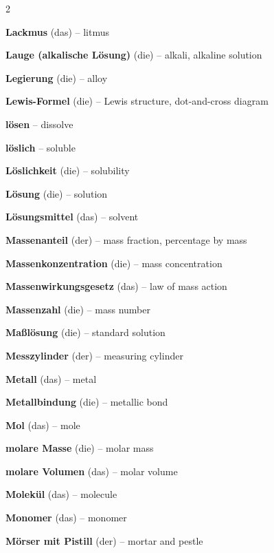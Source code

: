 \begin{multicols}{2}
\par\nopagebreak
\textbf{Lackmus} (das) -- litmus\dotfill\hyperref[e:160]{\pageref*{e:160}}\par
\textbf{Lauge (alkalische Lösung)} (die) -- alkali, alkaline solution\dotfill\hyperref[e:154]{\pageref*{e:154}}\par
\textbf{Legierung} (die) -- alloy\dotfill\hyperref[e:17]{\pageref*{e:17}}\par
\textbf{Lewis-Formel} (die) -- Lewis structure, dot-and-cross diagram\dotfill\hyperref[e:123]{\pageref*{e:123}}\par
\textbf{lösen} -- dissolve\dotfill\hyperref[e:67]{\pageref*{e:67}}\par
\textbf{löslich} -- soluble\dotfill\hyperref[e:11]{\pageref*{e:11}}\par
\textbf{Löslichkeit} (die) -- solubility\dotfill\hyperref[e:13]{\pageref*{e:13}}\par
\textbf{Lösung} (die) -- solution\dotfill\hyperref[e:8]{\pageref*{e:8}}\par
\textbf{Lösungsmittel} (das) -- solvent\dotfill\hyperref[e:9]{\pageref*{e:9}}\par

\par\nopagebreak
\textbf{Massenanteil} (der) -- mass fraction, percentage by mass\dotfill\hyperref[e:257]{\pageref*{e:257}}\par
\textbf{Massenkonzentration} (die) -- mass concentration\dotfill\hyperref[e:256]{\pageref*{e:256}}\par
\textbf{Massenwirkungsgesetz} (das) -- law of mass action\dotfill\hyperref[e:147]{\pageref*{e:147}}\par
\textbf{Massenzahl} (die) -- mass number\dotfill\hyperref[e:81]{\pageref*{e:81}}\par
\textbf{Maßlösung} (die) -- standard solution\dotfill\hyperref[e:176]{\pageref*{e:176}}\par
\textbf{Messzylinder} (der) -- measuring cylinder\dotfill\hyperref[e:43]{\pageref*{e:43}}\par
\textbf{Metall} (das) -- metal\dotfill\hyperref[e:18]{\pageref*{e:18}}\par
\textbf{Metallbindung} (die) -- metallic bond\dotfill\hyperref[e:115]{\pageref*{e:115}}\par
\textbf{Mol} (das) -- mole\dotfill\hyperref[e:249]{\pageref*{e:249}}\par
\textbf{molare Masse} (die) -- molar mass\dotfill\hyperref[e:252]{\pageref*{e:252}}\par
\textbf{molare Volumen} (das) -- molar volume\dotfill\hyperref[e:253]{\pageref*{e:253}}\par
\textbf{Molekül} (das) -- molecule\dotfill\hyperref[e:100]{\pageref*{e:100}}\par
\textbf{Monomer} (das) -- monomer\dotfill\hyperref[e:236]{\pageref*{e:236}}\par
\textbf{Mörser mit Pistill} (der) -- mortar and pestle\dotfill\hyperref[e:54]{\pageref*{e:54}}\par


\end{multicols}
